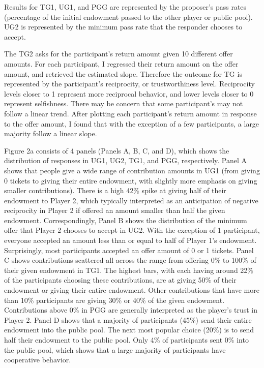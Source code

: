 \documentclass[12pt]{article}
\begin{document}
Results for TG1, UG1, and PGG are represented by the proposer\rq s pass rates (percentage of the initial endowment passed to the other player or public pool). UG2 is represented by the minimum pass rate that the responder chooses to accept. 

The TG2 asks for the participant\rq s return amount given 10 different offer amounts. For each participant, I regressed their return amount on the offer amount, and retrieved the estimated slope. Therefore the outcome for TG is represented by the participant\rq s reciprocity, or trustworthiness level. Reciprocity levels closer to 1 represent more reciprocal behavior, and lower levels closer to 0 represent selfishness. There may be concern that some participant\rq s may not follow a linear trend. After plotting each participant\rq s return amount in response to the offer amount, I found that with the exception of a few participants, a large majority follow a linear slope.

Figure 2a consists of 4 panels (Panels A, B, C, and D), which shows the distribution of responses in UG1, UG2, TG1, and PGG, respectively. Panel A shows that people give a wide range of contribution amounts in UG1 (from giving 0 tickets to giving their entire endowment, with slightly more emphasis on giving smaller contributions). There is a high 42\% spike at giving half of their endowment to Player 2, which typically interpreted as an anticipation of negative reciprocity in Player 2 if offered an amount smaller than half the given endowment. Correspondingly, Panel B shows the distribution of the minimum offer that Player 2 chooses to accept in UG2. With the exception of 1 participant, everyone accepted an amount less than or equal to half of Player 1's endowment. Surprisingly, most participants accepted an offer amount of 0 or 1 tickets. Panel C shows contributions scattered all across the range from offering 0\% to 100\% of their given endowment in TG1. The highest bars, with each having around 22\% of the participants choosing these contributions, are at giving 50\% of their endowment or giving their entire endowment. Other contributions that have more than 10\% participants are giving 30\% or 40\% of the given endowment. Contributions above 0\% in PGG are generally interpreted as the player\rq s trust in Player 2. Panel D shows that a majority of participants (45\%) send their entire endowment into the public pool. The next most popular choice (20\%) is to send half their endowment to the public pool. Only 4\% of participants sent 0\% into the public pool, which shows that a large majority of participants have cooperative behavior.
\end{document}
